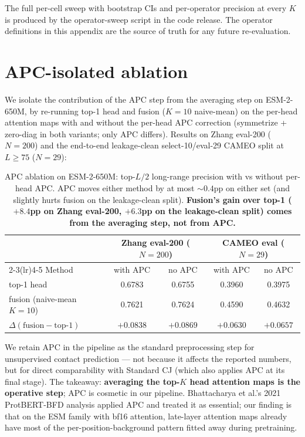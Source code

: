 \documentclass{article}
\begin{document}
The full per-cell sweep with bootstrap CIs and per-operator
precision at every $K$ is produced by the operator-sweep script in the
code release. The operator definitions in this appendix are the source
of truth for any future re-evaluation.

\section{APC-isolated ablation}
\label{app:apc-ablation}

We isolate the contribution of the APC step \citep{dunn2008apc} from
the averaging step on ESM-2-650M, by re-running top-1 head and fusion
($K{=}10$ naive-mean) on the per-head attention maps with and
without the per-head APC correction (symmetrize + zero-diag in both
variants; only APC differs). Results on Zhang eval-200 ($N{=}200$) and the
end-to-end leakage-clean select-10/eval-29 CAMEO split at $L \geq 75$ ($N{=}29$):

\begin{table}[h]
\centering
\small
\caption{APC ablation on ESM-2-650M: top-$L/2$ long-range precision
with vs without per-head APC. APC moves either method by at most
$\sim 0.4$pp on either set (and slightly hurts fusion on the
leakage-clean split). \textbf{Fusion's gain over
top-1 ($+8.4$pp on Zhang eval-200, $+6.3$pp on the leakage-clean
split) comes from the averaging step, not from APC.}}
\label{tab:apc-ablation}
\begin{tabular}{lcccc}
\toprule
 & \multicolumn{2}{c}{Zhang eval-200 ($N{=}200$)} & \multicolumn{2}{c}{CAMEO eval ($N{=}29$)} \\
\cmidrule(lr){2-3}\cmidrule(lr){4-5}
Method & with APC & no APC & with APC & no APC \\
\midrule
top-1 head            & 0.6783 & 0.6755 & 0.3960 & 0.3975 \\
fusion (naive-mean $K{=}10$) & 0.7621 & 0.7624 & 0.4590 & 0.4632 \\
\midrule
$\Delta(\text{fusion} - \text{top-1})$ & $+0.0838$ & $+0.0869$ & $+0.0630$ & $+0.0657$ \\
\bottomrule
\end{tabular}
\end{table}

We retain APC in the pipeline as the standard preprocessing step
for unsupervised contact prediction \citep{dunn2008apc,zhang2024cj} ---
not because it affects the reported numbers, but for direct
comparability with Standard CJ (which also applies APC at its final
stage). The takeaway: \textbf{averaging the top-$K$ head attention
maps is the operative step}; APC is cosmetic in our pipeline.
Bhattacharya et al.'s 2021 ProtBERT-BFD analysis applied APC and
treated it as essential; our finding is that on the ESM family
with bf16 attention, late-layer attention maps already have most of
the per-position-background pattern fitted away during pretraining.
\end{document}
